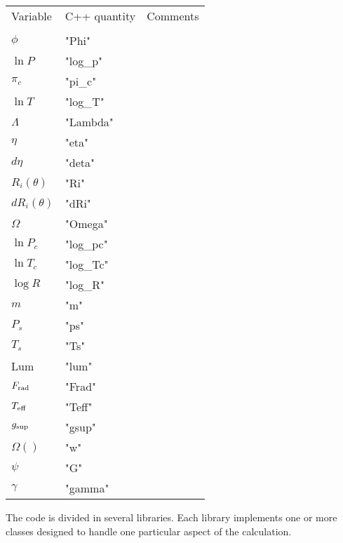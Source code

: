 \begin{center}
\begin{tabular}{lll}
\hline
Variable & C++ quantity & Comments \\
\\
$\phi$   &        "Phi"       \\
$\ln P$  &        "log\_p"      \\
$\pi_c$  &        "pi\_c"      \\
$\ln T$  &        "log\_T"      \\
$\Lambda$&        "Lambda"      \\
$\eta$   &        "eta"      \\
$d\eta$  &        "deta"      \\
$R_i(\theta)$&        "Ri"      \\
$dR_i(\theta)$&        "dRi"      \\
$\Omega$ &        "Omega"      \\
$\ln P_c$&        "log\_pc"      \\
$\ln T_c$&        "log\_Tc"      \\
$\log R$ &        "log\_R"      \\
$m$      &        "m"      \\
$P_s$    &        "ps"      \\
$T_s$    &        "Ts"      \\
Lum      &        "lum"      \\
$F_{\rm rad}$ &        "Frad"      \\
$T_{\rm eff}$ &        "Teff"      \\
$g_{\rm sup}$ &        "gsup"      \\
$\Omega()$ &        "w"      \\
$\psi$   &        "G"      \\
$\gamma$ &        "gamma"      \\
      \hline
\end{tabular}
\end{center}

\bigskip
\bigskip
The code is divided in several libraries. Each library implements one or
more classes designed to handle one particular aspect of the calculation.

